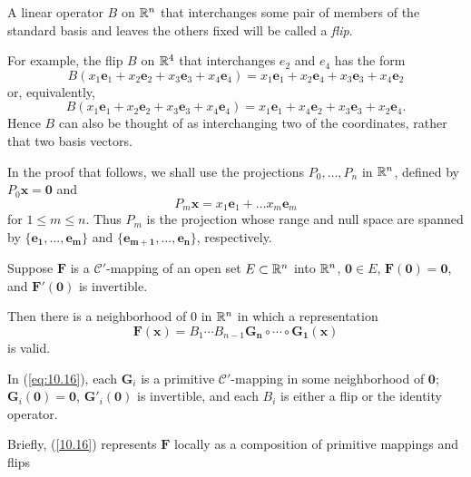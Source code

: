 \begin{myDef}
    \label{myDef:10.6}
    A linear operator $B$ on ${\protect\mathbb R}^n$ that interchanges some pair of members of the standard basis and leaves the others fixed will be called a \emph{flip}.

    For example, the flip $B$ on ${\protect\mathbb R}^4$ that interchanges $e_2$ and $e_4$ has the form
    \begin{equation}
        \label{eq:10.13}
        B(x_1 \mathbf{e}_1 + 
        x_2 \mathbf{e}_2 + 
        x_3 \mathbf{e}_3 + 
        x_4 \mathbf{e}_4) = 
        x_1 \mathbf{e}_1 + 
        x_2 \mathbf{e}_4 + 
        x_3 \mathbf{e}_3 + 
        x_4 \mathbf{e}_2
    \end{equation}
    or, equivalently,
    \begin{equation}
        \label{eq:10.14}
        B(x_1 \mathbf{e}_1 + 
        x_2 \mathbf{e}_2 + 
        x_3 \mathbf{e}_3 + 
        x_4 \mathbf{e}_4) = 
        x_1 \mathbf{e}_1 + 
        x_4 \mathbf{e}_2 +
        x_3 \mathbf{e}_3 + 
        x_2 \mathbf{e}_4 .
    \end{equation}
    Hence $B$ can also be thought of as interchanging two of the coordinates,
    rather that two basis vectors.

    In the proof that follows, we shall use the projections $P_0,\dots,P_n$ in ${\protect\mathbb R}^n$, defined by $P_0 \mathbf{x = 0}$ and 
    \begin{equation}
        \label{eq:10.15}
        P_m \mathbf{x} = 
        x_1 \mathbf{e}_1 + \dots 
        x_m \mathbf{e}_m 
    \end{equation}
    for $1 \leq m \leq n$.
    Thus $P_m$ is the projection whose range and null space are spanned by $\{\mathbf{e_1,...,e_m}\}$ and $\{\mathbf{e_{m+1},...,e_n}\}$,
    respectively.
\end{myDef}

\begin{thm}
    \label{thm:10.7}
    Suppose $\mathbf{F}$ is a $\mathscr{C}'$-mapping of an open set $E \subset {\protect\mathbb R}^n$ into ${\protect\mathbb R}^n$, $\mathbf{0} \in E$, $\mathbf{F(0) = 0}$, and $\mathbf{F'(0)}$ is invertible.
    
    Then there is a neighborhood of $0$ in ${\protect\mathbb R}^n$ in which a representation
    \begin{equation}
        \label{eq:10.16}
        \mathbf{F(x)} = B_1 \cdots B_{n-1} \mathbf{G_n \circ \cdots \circ G_1(x)}
    \end{equation}
    is valid.

    In (\ref{eq:10.16}), each $\mathbf{G}_i$ is a primitive $\mathscr{C}'$-mapping in some neighborhood of $\mathbf{0}$;
    $\mathbf{G}_i(\mathbf{0})=\mathbf{0}$, $\mathbf{G}'_i(\mathbf{0})$ is invertible, and each $B_i$ is either a flip or the identity operator.
\end{thm}

Briefly, (\ref{10.16}) represents $\mathbf{F}$ locally as a composition of primitive mappings and flips



